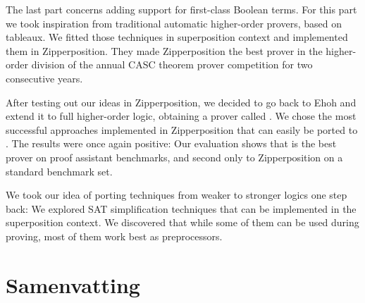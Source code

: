 The last part concerns adding support for
first-class Boolean terms. For this part we took inspiration from traditional
automatic higher-order provers, based on tableaux. We fitted those techniques in
superposition context and implemented them in Zipperposition. They
made Zipperposition the best prover in the higher-order division of the annual CASC
theorem prover competition for two consecutive years.

After testing out our ideas in Zipperposition, we decided to go back to Ehoh and
extend it to full higher-order logic, obtaining a prover called \ehohii{}. We
chose the most successful approaches implemented in Zipperposition that can
easily be ported to \ehohii{}. The results were once again positive: Our
evaluation shows that \ehohii{} is the best prover on proof assistant
benchmarks, and second only to Zipperposition on a standard benchmark set.

We took our idea of porting techniques from weaker to stronger logics one step
back: We explored SAT simplification techniques that can be implemented in the
superposition context. We discovered that while some of them can be used during proving,
most of them work best as preprocessors.


\chapter*{Samenvatting}

{


}



